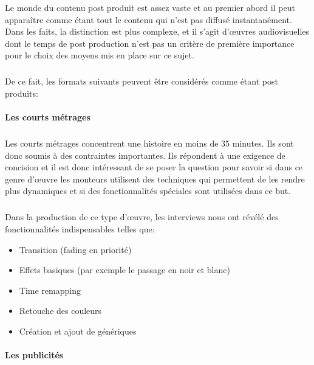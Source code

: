 Le monde du contenu post produit est assez vaste et au premier abord
il peut apparaître comme étant tout le contenu qui n'est pas diffusé
instantanément. Dans les faits, la distinction est plus complexe, et il
s'agit d'œuvres audiovisuelles dont le temps de post production n'est
pas un critère de première importance pour le choix des moyens mis
en place sur ce sujet.

\subparagraph{}

De ce fait, les formats suivants peuvent être considérés comme étant
post produits:

\paragraph{Les courts métrages}

\subparagraph{}

Les courts métrages concentrent une histoire en moins de 35 minutes. Ils
sont donc soumis à des contraintes importantes. Ils répondent à
une exigence de concision et il est donc intéressant de se poser la
question pour savoir si dans ce genre d'œuvre les monteurs utilisent
des techniques qui permettent de les rendre plus dynamiques et si des
fonctionnalités spéciales sont utilisées dans ce but.

\subparagraph{}

Dans la production de ce type d'œuvre, les interviews nous ont révélé
des fonctionnalités indispensables telles que:

\begin{itemize} \setlength{\itemsep}{2mm}

  \item{Transition (fading en priorité)}

  \item{Effets basiques (par exemple le passage en noir et blanc)}

  \item{Time remapping}

  \item{Retouche des couleurs}

  \item{Création et ajout de génériques}

\end{itemize}

\paragraph {Les publicités}

\subparagraph{}

